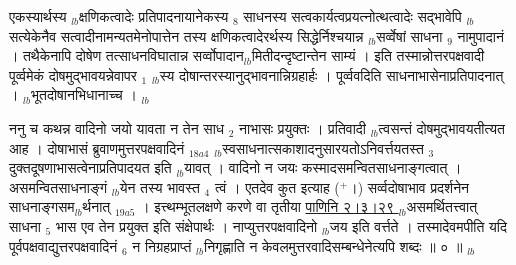 \documentclass[article,12pt,a4paper]{memoir}%
\newcommand{\add}[1]{($^{+}$#1)}
\newcounter{parCount}
\begin{document}
एकस्यार्थस्य {\tiny $_{lb}$}क्षणिकत्वादेः प्रतिपादनायानेकस्य {\tiny $_{8}$} साधनस्य सत्वकार्यत्वप्रयत्नोत्थत्वादेः सद्भावेपि {\tiny $_{lb}$}सत्येकेनैव सत्वादीनामन्यतमेनोपात्तेन तस्य क्षणिकत्वादेरर्थस्य सिद्धेर्निश्चयान्न {\tiny $_{lb}$}सर्व्वेषां साधना {\tiny $_{9}$} \leavevmode{} नामुपादानं । तथैकेनापि दोषेण तत्साधनविघातान्न सर्व्वोपादान{\tiny $_{lb}$}मितीदन्दृष्टान्तेन साम्यं । इति तस्मान्नोत्तरपक्षवादी पूर्व्वमेकं दोषमुद्भावयन्नेवापर {\tiny $_{1}$} {\tiny $_{lb}$}स्य दोषान्तरस्यानुद्भावनान्निग्रहार्हः । पूर्व्ववदिति साधनाभासेनाप्रतिपादनात् । {\tiny $_{lb}$}भूतदोषानभिधानाच्च ।
	{}
	\pend%
      {\tiny $_{lb}$}

	  
	  \pstart \leavevmode%
	ननु च कथन्न वादिनो जयो यावता न तेन साध {\tiny $_{2}$} नाभासः प्रयुक्तः । प्रतिवादी {\tiny $_{lb}$}त्वसन्तं दोषमुद्भावयतीत्यत आह । {\color{DodgerBlue3}दोषाभासं} ब्रुवाणमुत्तरपक्षवादिनं {\tiny $_{18a4}$} {\tiny $_{lb}$}स्वसाधनात्सकाशादनुसारयतोऽनिवर्त्तयतस्त {\tiny $_{3}$} दुक्तदूषणाभासत्वेनाप्रतिपादयत इति {\tiny $_{lb}$}यावत् । वादिनो न जयः कस्मादसमन्वितसाधनाङ्गत्वात् । असमन्वितसाधनाङ्गं {\tiny $_{lb}$}येन तस्य भावस्त {\tiny $_{4}$} त्वं । एतदेव कुत इत्याह \add{।} {\color{DodgerBlue3}सर्व्वदोषाभाव} प्रदर्शनेन साधनाङ्गसम{\tiny $_{lb}$}र्थनात् {\tiny $_{19a5}$} । इत्त्थम्भूतलक्षणे करणे वा तृतीया \href{http://sarit.indology.info/?cref=P\%C4\%81.2.3.29}{पाणिनि २।३।२९ } {\tiny $_{lb}$}असमर्थितत्त्वात् साधना {\tiny $_{5}$} भास एव तेन प्रयुक्त इति संक्षेपार्थः । नाप्युत्तरपक्षवादिनो {\tiny $_{lb}$}जय इति वर्त्तते । तस्मादेवमपीति यदि पूर्वपक्षवाद्युत्तरपक्षवादिनं {\tiny $_{6}$} न निग्रहप्राप्तं {\tiny $_{lb}$}निगृह्णाति न केवलमुत्तरवादिसम्बन्धेनेत्यपि शब्दः ॥ ० ॥
	{}
	\pend%
      {\tiny $_{lb}$}
\end{document}
